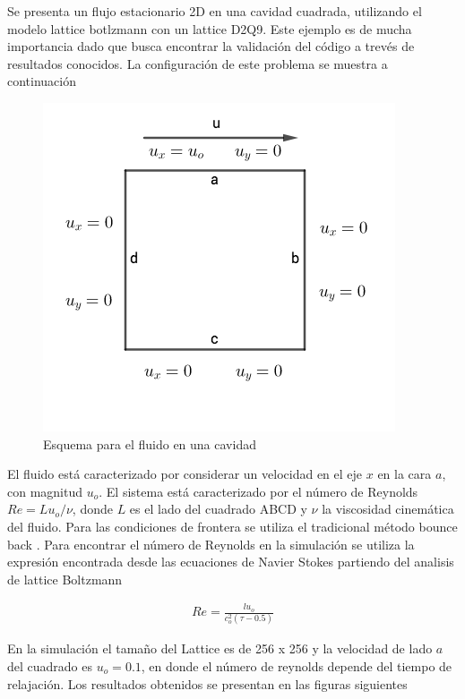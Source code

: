 Se presenta un flujo estacionario 2D en una cavidad cuadrada, utilizando el modelo lattice botlzmann con un lattice D2Q9. Este ejemplo es de mucha importancia dado que busca encontrar la validación del código a trevés de resultados conocidos. La configuración de este problema se muestra a continuación 


\begin{figure}[H]
\centering
\includegraphics[scale = 0.6]{cavidad.png}
\caption{Esquema para el fluido en una cavidad}
\label{Poiseuille_100}
\end{figure}

\noindent El fluido está caracterizado por considerar un velocidad en el eje $x$ en la cara $a$, con magnitud $u_{o}$. El sistema está caracterizado por el número de Reynolds $Re = Lu_{o}/\nu$, donde $L$ es el lado del cuadrado ABCD y $\nu$ la viscosidad cinemática del fluido. Para las condiciones de frontera se utiliza el tradicional método bounce back \cite{kruger}. Para encontrar el número de Reynolds en la simulación se utiliza la expresión encontrada desde las ecuaciones de Navier Stokes partiendo del analisis de lattice Boltzmann

\begin{eqnarray}
Re = \frac{l u_{o}}{c_{o}^{2}(\tau - 0.5)}
\end{eqnarray}

\noindent En la simulación el tamaño del Lattice es de 256 x 256 y la velocidad de lado $a$ del cuadrado es $u_{o}= 0.1$, en donde el número de reynolds depende del tiempo de relajación. Los resultados obtenidos se presentan en las figuras siguientes

